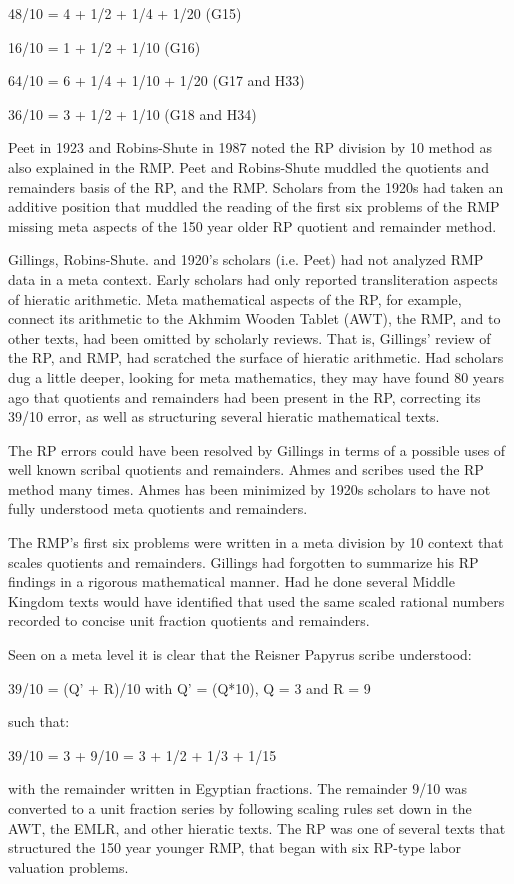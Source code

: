 \documentclass[12pt]{article}
\begin{document}
48/10 = 4 + 1/2 + 1/4 + 1/20 (G15)

16/10 = 1 + 1/2 + 1/10 (G16)

64/10 = 6 + 1/4 + 1/10 + 1/20 (G17 and H33)

36/10 = 3 + 1/2 + 1/10 (G18 and H34)

Peet in 1923 and Robins-Shute in 1987 noted the RP division by 10 method as also explained in the RMP. Peet and Robins-Shute muddled the quotients and remainders basis of the RP, and the RMP. Scholars from the 1920s had taken an additive position that muddled the reading of the first six problems of the RMP missing meta aspects of the 150 year older RP quotient and remainder method.

Gillings, Robins-Shute. and 1920's scholars (i.e. Peet) had not analyzed RMP data in a meta context. Early scholars had only reported transliteration aspects of  hieratic arithmetic. Meta mathematical aspects of the RP, for example, connect its arithmetic to the Akhmim Wooden Tablet (AWT), the RMP, and to other texts, had been omitted by scholarly reviews. That is, Gillings' review of the RP, and RMP, had scratched the surface of hieratic arithmetic. Had scholars dug a little deeper, looking for meta mathematics, they may have found 80 years ago that quotients and remainders had been present in the RP, correcting its 39/10 error, as well as structuring several hieratic mathematical texts.

The RP errors could have been resolved by Gillings in terms of a possible uses of well known scribal quotients and remainders. Ahmes and scribes used the RP method many times. Ahmes has been minimized by 1920s scholars to have not fully understood meta quotients and remainders. 

The RMP's first six problems were written in a meta division by 10 context that scales quotients and remainders. Gillings had forgotten to summarize his RP findings in a rigorous mathematical manner. Had he done several Middle Kingdom texts would have identified that used the same scaled rational numbers recorded to concise unit fraction quotients and remainders.

Seen on a meta level it is clear that the Reisner Papyrus scribe understood:

39/10 = (Q' + R)/10 with Q' = (Q*10), Q = 3 and R = 9

such that:

39/10 = 3 + 9/10 = 3 + 1/2 + 1/3 + 1/15

with the remainder written in Egyptian fractions. The remainder 9/10 was converted to a unit fraction series by following scaling rules set down in the AWT, the EMLR, and other hieratic texts. The RP was one of several texts that structured the 150 year younger RMP, that began with six RP-type labor valuation problems.
\end{document}
